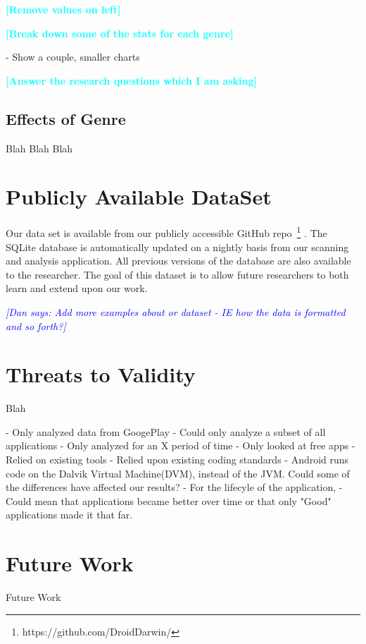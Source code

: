 \documentclass{sig-alternate}
\newcommand{\todo}[1]{\textcolor{cyan}{\textbf{[#1]}}}
\newcommand{\dan}[1]{\textcolor{blue}{{\it [Dan says: #1]}}}
\begin{document}
\todo{Remove values on left}







\todo{Break down some of the stats for each genre}



- Show a couple, smaller charts


\todo{Answer the research questions which I am asking}


\subsection{Effects of Genre}
Blah Blah Blah



\section{Publicly Available DataSet}

Our data set is available from our publicly accessible GitHub repo~\footnote{https://github.com/DroidDarwin/} . The SQLite database is automatically updated on a nightly basis from our scanning and analysis application. All previous versions of the database are also available to the researcher. The goal of this dataset is to allow future researchers to both learn and extend upon our work.

\dan{Add more examples about or dataset - IE how the data is formatted and so forth?}


\section{Threats to Validity}

 Blah


- Only analyzed data from GoogePlay
- Could only analyze a subset of all applications
- Only analyzed for an X period of time
- Only looked at free apps
- Relied on existing tools
- Relied upon existing coding standards
- Android runs code on the Dalvik Virtual Machine(DVM)\cite{Mirzaei:2012:TAA:2382756.2382798}, instead of the JVM. Could some of the differences have affected our results?
- For the lifecyle of the application, - Could mean that applications became better over time or that only "Good" applications made it that far.


\section{Future Work}
\label{sec: futurework}
Future Work
\end{document}
